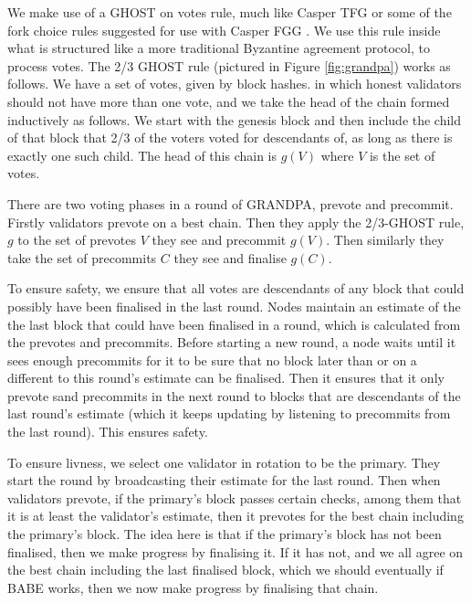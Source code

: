 We make use of a GHOST on votes rule, much like Casper TFG \cite{CasperTFG} or some of the fork choice rules suggested for use with Casper FGG \cite{CasperFFG}. We use this rule inside what is structured like a more traditional Byzantine agreement protocol, to process votes. The 2/3 GHOST rule (pictured in Figure \ref{fig:grandpa})  works as follows. We have a set of votes, given by block hashes.  in which honest validators should not have more than one vote, and we take the head of the chain formed inductively as follows. We start with the genesis block and then include the child of that block that 2/3 of the voters voted for descendants of, as long as there is exactly one such child. The head of this chain is $g(V)$ where $V$ is the set of votes.

There are two voting phases in a round of GRANDPA, prevote and precommit. Firstly validators prevote on a best chain. Then they apply the 2/3-GHOST rule, $g$ to the set of prevotes $V$ they see and precommit $g(V)$. Then similarly they take the set of precommits $C$ they see and finalise $g(C)$.

To ensure safety, we ensure that all votes are descendants of any block that could possibly have been finalised in the last round. Nodes maintain an estimate of the the last block that could have been finalised in a round, which is calculated from the prevotes and precommits. Before starting a new round, a node waits until it sees enough precommits for it to be sure that no block later than or on a different to this round's estimate can be finalised. Then it ensures that it only prevote sand precommits in the next round to blocks that are descendants of the last round's estimate (which it keeps updating by listening to precommits from the last round). This ensures safety.

To ensure livness, we select one validator in rotation to be the primary. They start the round by broadcasting their estimate for the last round. Then when validators prevote, if the primary's block passes certain checks, among them that it is at least the validator's estimate, then it prevotes for the best chain including the primary's block. The idea here is that if the primary's block has not been finalised, then we make progress by finalising it. If it has not, and we all agree on the best chain including the last finalised block, which we should eventually if BABE works, then we now make progress by finalising that chain.
  


